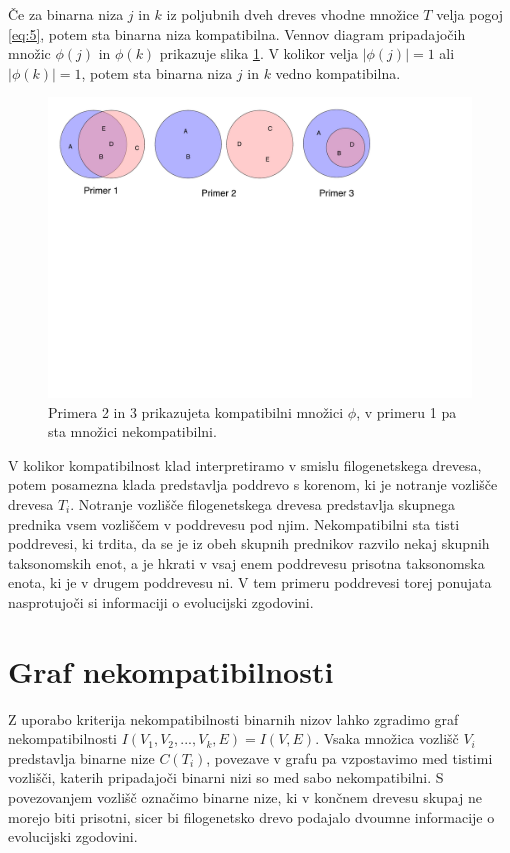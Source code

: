\documentclass[a4paper, 12pt]{book}
\begin{document}
Če za binarna niza $j$ in $k$ iz poljubnih dveh dreves vhodne množice $T$ velja pogoj \ref{eq:5}, potem sta binarna niza kompatibilna. Vennov diagram pripadajočih množic $\phi(j)$ in $\phi(k)$ prikazuje slika \ref{img-venn-compatibility}. V kolikor velja $\left|\phi(j)\right| = 1$ ali $\left|\phi(k)\right| = 1$, potem sta binarna niza $j$ in $k$ vedno kompatibilna.   

\begin{figure}
	\begin{center}
		\includegraphics[scale=0.54, clip=true, trim=0 15cm 0 0]{gfx/venn-amt-compatibility.pdf}
	\end{center}
	\caption{Primera 2 in 3 prikazujeta kompatibilni množici $\phi$, v primeru 1 pa sta množici nekompatibilni.}
	\label{img-venn-compatibility}
\end{figure}

V kolikor kompatibilnost klad interpretiramo v smislu filogenetskega drevesa, potem posamezna klada predstavlja poddrevo s korenom, ki je notranje vozlišče drevesa $T_i$. Notranje vozlišče filogenetskega drevesa predstavlja skupnega prednika vsem vozliščem v poddrevesu pod njim. Nekompatibilni sta tisti poddrevesi, ki trdita, da se je iz obeh skupnih prednikov razvilo nekaj skupnih taksonomskih enot, a je hkrati v vsaj enem poddrevesu prisotna taksonomska enota, ki je v drugem poddrevesu ni. V tem primeru poddrevesi torej ponujata nasprotujoči si informaciji o evolucijski zgodovini. 

\section{Graf nekompatibilnosti}
Z uporabo kriterija nekompatibilnosti binarnih nizov lahko zgradimo graf nekompatibilnosti $I(V_1, V_2, ..., V_k, E) = I(V, E)$. Vsaka množica vozlišč $V_i$ predstavlja binarne nize $C(T_i)$, povezave v grafu pa vzpostavimo med tistimi vozlišči, katerih pripadajoči binarni nizi so med sabo nekompatibilni\cite{pw}. S povezovanjem vozlišč označimo binarne nize, ki v končnem drevesu skupaj ne morejo biti prisotni, sicer bi filogenetsko drevo podajalo dvoumne informacije o evolucijski zgodovini. 
\end{document}
